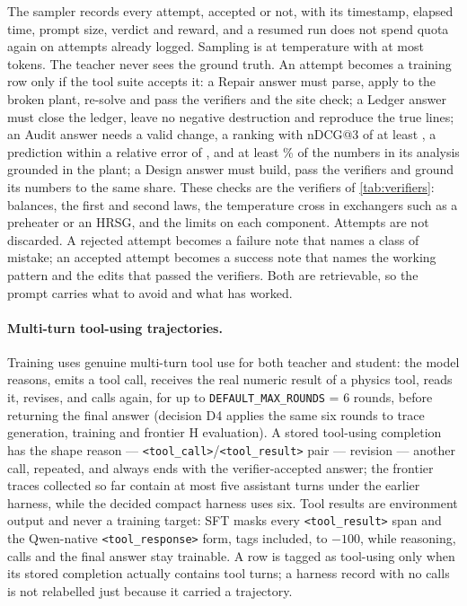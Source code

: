 The sampler records every attempt, accepted or not, with its timestamp, elapsed time, prompt size, verdict and reward, and a resumed run does not spend quota again on attempts already logged. Sampling is at temperature  with at most  tokens. The teacher never sees the ground truth.
An attempt becomes a training row only if the tool suite accepts it:
a Repair answer must parse, apply to the broken plant, re-solve and pass the verifiers and the site check; a Ledger answer must close the ledger, leave no negative destruction and reproduce the true lines;
an Audit answer needs a valid change, a ranking with nDCG@3 of at least , a prediction within a relative error of , and at least \% of the numbers in its analysis grounded in the plant; a Design answer must build, pass the verifiers and ground its numbers to the same share.
These checks are the verifiers of \cref{tab:verifiers}: balances, the first and second laws, the temperature cross in exchangers such as a preheater or an HRSG, and the limits on each component.
Attempts are not discarded. A rejected attempt becomes a failure note that names a class of mistake; an accepted attempt becomes a success note that names the working pattern and the edits that passed the verifiers. Both are retrievable, so the prompt carries what to avoid and what has worked.

\paragraph{Multi-turn tool-using trajectories.}
Training uses genuine multi-turn tool use for both teacher and student: the model reasons, emits a tool call, receives the real numeric result of a physics tool, reads it, revises, and calls again, for up to \texttt{DEFAULT\_MAX\_ROUNDS} = 6 rounds, before returning the final answer (decision D4 applies the same six rounds to trace generation, training and frontier H evaluation). A stored tool-using completion has the shape reason --- \texttt{<tool\_call>}/\texttt{<tool\_result>} pair --- revision --- another call, repeated, and always ends with the verifier-accepted answer; the frontier traces collected so far contain at most five assistant turns under the earlier harness, while the decided compact harness uses six. Tool results are environment output and never a training target: SFT masks every \texttt{<tool\_result>} span and the Qwen-native \texttt{<tool\_response>} form, tags included, to $-100$, while reasoning, calls and the final answer stay trainable. A row is tagged as tool-using only when its stored completion actually contains tool turns; a harness record with no calls is not relabelled just because it carried a trajectory.

